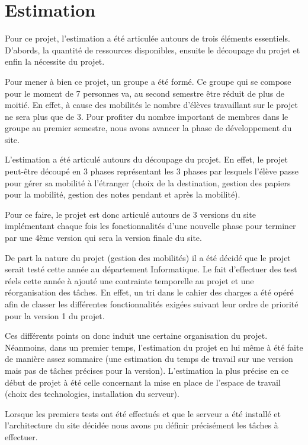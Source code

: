 \chapter{Estimation}

Pour ce projet, l'estimation a été articulée autours de trois éléments essentiels. D'abords, la quantité de ressources disponibles, ensuite le découpage du projet et enfin la nécessite du projet.

\smallbreak

Pour mener à bien ce projet, un groupe a été formé. Ce groupe qui se compose pour le moment de 7 personnes va, au second semestre être réduit de plus de moitié. En effet, à cause des mobilités le nombre d'élèves travaillant sur le projet ne sera plus que de 3. Pour profiter du nombre important de membres dans le groupe au premier semestre, nous avons avancer la phase de développement du site. 

\smallbreak

L'estimation a été articulé autours du découpage du projet. En effet, le projet peut-être découpé en 3 phases représentant les 3 phases par lesquels l'élève passe pour gérer sa mobilité à l'étranger (choix de la destination, gestion des papiers pour la mobilité, gestion des notes pendant et après la mobilité). 

Pour ce faire, le projet est donc articulé autours de 3 versions du site implémentant chaque fois les fonctionnalités d'une nouvelle phase pour terminer par une 4ème version qui sera la version finale du site.

\smallbreak

De part la nature du projet (gestion des mobilités) il a été décidé que le projet serait testé cette année au département Informatique. Le fait d'effectuer des test réels cette année à ajouté une contrainte temporelle au projet et une réorganisation des tâches. En effet, un tri dans le cahier des charges a été opéré afin de classer les différentes fonctionnalités exigées suivant leur ordre de priorité pour la version 1 du projet.

\bigbreak

Ces différents points on donc induit une certaine organisation du projet. Néanmoins, dans un premier temps, l'estimation du projet en lui même à été faite de manière assez sommaire (une estimation du temps de travail sur une version mais pas de tâches précises pour la version). L'estimation la plus précise en ce début de projet à été celle concernant la mise en place de l'espace de travail (choix des technologies, installation du serveur). 

Lorsque les premiers tests ont été effectués et que le serveur a été installé et l'architecture du site décidée nous avons pu définir précisément les tâches à effectuer.
